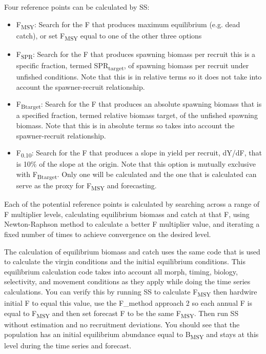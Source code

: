 Four reference points can be calculated by SS:
\begin{itemize}
	\item F\textsubscript{MSY}: Search for the F that produces maximum equilibrium (e.g. dead catch), or set F\textsubscript{MSY} equal to one of the other three options
	\item F\textsubscript{SPR}: Search for the F that produces spawning biomass per recruit this is a specific fraction, termed SPR\textsubscript{target}, of spawning biomass per recruit under unfished conditions. Note that this is in relative terms so it does not take into account the spawner-recruit relationship.
	\item F\textsubscript{Btarget}: Search for the F that produces an absolute spawning biomass that is a specified fraction, termed relative biomass target, of the unfished spawning biomass. Note that this is in absolute terms so takes into account the spawner-recruit relationship. 
	\item F\textsubscript{0.10}: Search for the F that produces a slope in yield per recruit, dY/dF, that is 10\% of the slope at the origin. Note that this option is mutually exclusive with F\textsubscript{Btarget}. Only one will be calculated and the one that is calculated can serve as the proxy for F\textsubscript{MSY} and forecasting.
\end{itemize}

Each of the potential reference points is calculated by searching across a range of F multiplier levels, calculating equilibrium biomass and catch at that F, using Newton-Raphson method to calculate a better F multiplier value, and iterating a fixed number of times to achieve convergence on the desired level.

The calculation of equilibrium biomass and catch uses the same code that is used to calculate the virgin conditions and the initial equilibrium conditions.  This equilibrium calculation code takes into account all morph, timing, biology, selectivity, and movement conditions as they apply while doing the time series calculations.  You can verify this by running SS to calculate F\textsubscript{MSY} then hardwire initial F to equal this value, use the F\_method approach 2 so each annual F is equal to F\textsubscript{MSY} and then set forecast F to be the same F\textsubscript{MSY}.  Then run SS without estimation and no recruitment deviations.  You should see that the population has an initial equilibrium abundance equal to B\textsubscript{MSY} and stays at this level during the time series and forecast.

